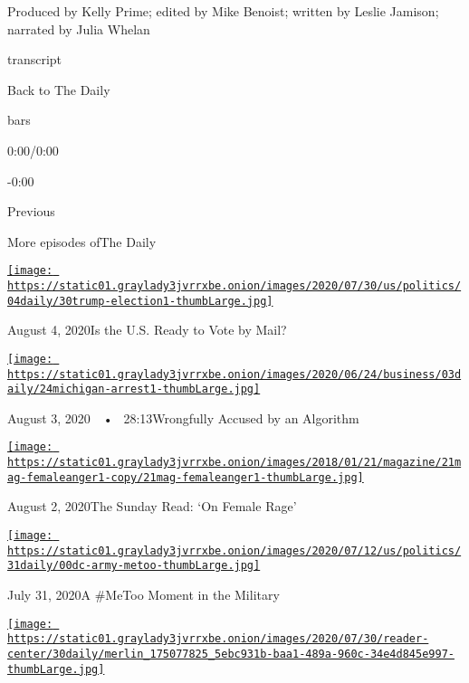 Produced by Kelly Prime; edited by Mike Benoist; written by Leslie
Jamison; narrated by Julia Whelan

transcript

Back to The Daily

bars

0:00/0:00

-0:00

Previous

More episodes ofThe Daily

\href{https://www.nytimes3xbfgragh.onion/2020/08/04/podcasts/the-daily/mail-in-voting-president-trump.html?action=click\&module=audio-series-bar\&region=header\&pgtype=Article}{\texttt{[image: https://static01.graylady3jvrrxbe.onion/images/2020/07/30/us/politics/04daily/30trump-election1-thumbLarge.jpg]}}

August 4, 2020Is the U.S. Ready to Vote by Mail?

\href{https://www.nytimes3xbfgragh.onion/2020/08/03/podcasts/the-daily/algorithmic-justice-racism.html?action=click\&module=audio-series-bar\&region=header\&pgtype=Article}{\texttt{[image: https://static01.graylady3jvrrxbe.onion/images/2020/06/24/business/03daily/24michigan-arrest1-thumbLarge.jpg]}}

August 3, 2020~~•~ 28:13Wrongfully Accused by an Algorithm

\href{https://www.nytimes3xbfgragh.onion/2020/08/02/podcasts/the-daily/on-female-rage.html?action=click\&module=audio-series-bar\&region=header\&pgtype=Article}{\texttt{[image: https://static01.graylady3jvrrxbe.onion/images/2018/01/21/magazine/21mag-femaleanger1-copy/21mag-femaleanger1-thumbLarge.jpg]}}

August 2, 2020The Sunday Read: `On Female Rage'

\href{https://www.nytimes3xbfgragh.onion/2020/07/31/podcasts/the-daily/vanessa-guillen-military-metoo.html?action=click\&module=audio-series-bar\&region=header\&pgtype=Article}{\texttt{[image: https://static01.graylady3jvrrxbe.onion/images/2020/07/12/us/politics/31daily/00dc-army-metoo-thumbLarge.jpg]}}

July 31, 2020A \#MeToo Moment in the Military

\href{https://www.nytimes3xbfgragh.onion/2020/07/30/podcasts/the-daily/congress-facebook-amazon-google-apple.html?action=click\&module=audio-series-bar\&region=header\&pgtype=Article}{\texttt{[image: https://static01.graylady3jvrrxbe.onion/images/2020/07/30/reader-center/30daily/merlin\_175077825\_5ebc931b-baa1-489a-960c-34e4d845e997-thumbLarge.jpg]}}


